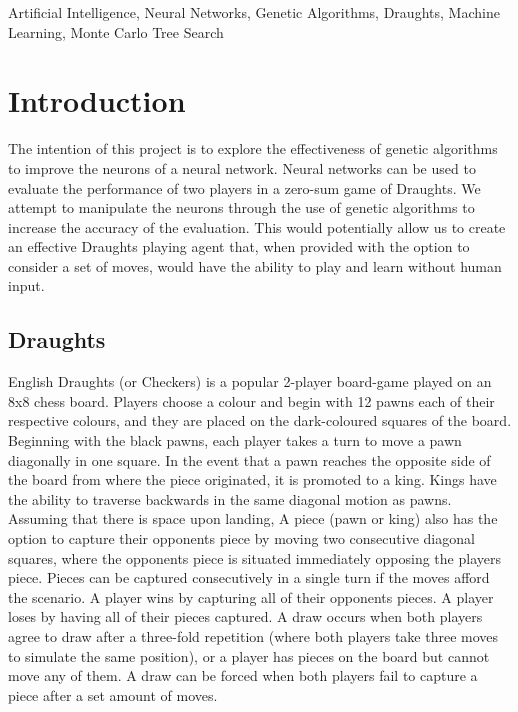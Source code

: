 \documentclass[12pt,a4paper]{article}
\begin{document}
\begin{keywords}
    Artificial Intelligence, Neural Networks, Genetic Algorithms, Draughts, Machine Learning, Monte Carlo Tree Search
\end{keywords}

\section{Introduction}

    The intention of this project is to explore the effectiveness of genetic algorithms to improve the neurons of a neural network. Neural networks can be used to evaluate the performance of two players in a zero-sum game of Draughts. We attempt to manipulate the neurons through the use of genetic algorithms to increase the accuracy of the evaluation. This would potentially allow us to create an effective Draughts playing agent that, when provided with the option to consider a set of moves, would have the ability to play and learn without human input.

\subsection*{Draughts}

    English Draughts (or Checkers) is a popular 2-player board-game played on an 8x8 chess board. Players choose a colour and begin with 12 pawns each of their respective colours, and they are placed on the dark-coloured squares of the board. Beginning with the black pawns, each player takes a turn to move a pawn diagonally in one square. In the event that a pawn reaches the opposite side of the board from where the piece originated, it is promoted to a king. Kings have the ability to traverse backwards in the same diagonal motion as pawns. Assuming that there is space upon landing, A piece (pawn or king) also has the option to capture their opponents piece by moving two consecutive diagonal squares, where the opponents piece is situated immediately opposing the players piece. Pieces can be captured consecutively in a single turn if the moves afford the scenario. A player wins by capturing all of their opponents pieces. A player loses by having all of their pieces captured. A draw occurs when both players agree to draw after a three-fold repetition (where both players take three moves to simulate the same position), or a player has pieces on the board but cannot move any of them. A draw can be forced when both players fail to capture a piece after a set amount of moves.
\end{document}
